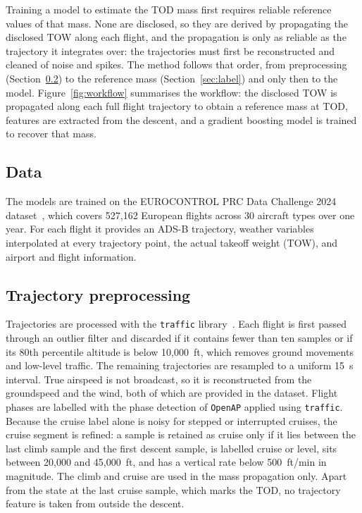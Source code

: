 \documentclass[
  manuscript=proceedings,  %
  layout=preprint,  %
  year=2026,
  volume=x,
]{extra/joas}
\begin{document}
Training a model to estimate the TOD mass first requires reliable reference values of that mass. None are disclosed, so they are derived by propagating the disclosed TOW along each flight, and the propagation is only as reliable as the trajectory it integrates over: the trajectories must first be reconstructed and cleaned of noise and spikes. The method follows that order, from preprocessing (Section~\ref{sec:preprocessing}) to the reference mass (Section~\ref{sec:label}) and only then to the model. Figure~\ref{fig:workflow} summarises the workflow: the disclosed TOW is propagated along each full flight trajectory to obtain a reference mass at TOD, features are extracted from the descent, and a gradient boosting model is trained to recover that mass.




\subsection{Data}
\label{sec:data}

The models are trained on the EUROCONTROL PRC Data Challenge 2024 dataset~\cite{prc2024}, which covers 527{,}162 European flights across 30 aircraft types over one year. For each flight it provides an ADS-B trajectory, weather variables interpolated at every trajectory point, the actual takeoff weight (TOW), and airport and flight information.

\subsection{Trajectory preprocessing}
\label{sec:preprocessing}

Trajectories are processed with the \texttt{traffic} library~\cite{traffic}. Each flight is first passed through an outlier filter and discarded if it contains fewer than ten samples or if its 80th percentile altitude is below 10{,}000~ft, which removes ground movements and low-level traffic. The remaining trajectories are resampled to a uniform 15~s interval. True airspeed is not broadcast, so it is reconstructed from the groundspeed and the wind, both of which are provided in the dataset. Flight phases are labelled with the phase detection of \texttt{OpenAP} applied using \texttt{traffic}. Because the cruise label alone is noisy for stepped or interrupted cruises, the cruise segment is refined: a sample is retained as cruise only if it lies between the last climb sample and the first descent sample, is labelled cruise or level, sits between 20{,}000 and 45{,}000~ft, and has a vertical rate below 500~ft/min in magnitude. The climb and cruise are used in the mass propagation only. Apart from the state at the last cruise sample, which marks the TOD, no trajectory feature is taken from outside the descent.
\end{document}
